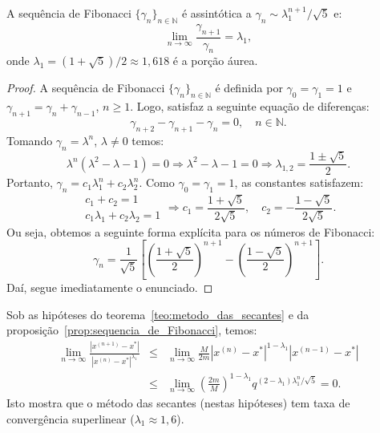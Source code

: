 \begin{prop}\label{prop:sequencia_de_Fibonacci}
  A sequência de Fibonacci $\{\gamma_n\}_{n\in\mathbb{N}}$ é assintótica a $\gamma_n \sim \lambda_1^{n+1}/\sqrt{5}$ e:
\begin{equation*}
  \lim_{n\to\infty} \frac{\gamma_{n+1}}{\gamma_{n}} = \lambda_1,
\end{equation*}
onde $\lambda_1 = (1+\sqrt{5})/2\approx 1,618$ é a porção áurea.
\end{prop}
\begin{proof}
  A sequência de Fibonacci $\{\gamma_n\}_{n\in\mathbb{N}}$ é definida por $\gamma_0 = \gamma_1 = 1$ e $\gamma_{n+1} = \gamma_n + \gamma_{n-1}$, $n\geq 1$. Logo, satisfaz a seguinte equação de diferenças:
  \begin{equation*}
    \gamma_{n+2} - \gamma_{n+1} - \gamma_{n} = 0,\quad n\in\mathbb{N}.
  \end{equation*}
Tomando $\gamma_n = \lambda^n$, $\lambda\neq 0$ temos:
\begin{equation*}
  \lambda^n\left(\lambda^2 - \lambda - 1\right) = 0 \Rightarrow   \lambda^2 - \lambda - 1 = 0 \Rightarrow \lambda_{1,2} = \frac{1 \pm \sqrt{5}}{2}.
\end{equation*}
Portanto, $\gamma_n = c_1\lambda_1^n + c_2\lambda_2^n$. Como $\gamma_0 = \gamma_1 = 1$, as constantes satisfazem:
\begin{equation*}
  \begin{array}{l}
    c_1 + c_2 = 1\\
    c_1\lambda_1 + c_2\lambda_2 = 1
  \end{array}
    \Rightarrow
    c_1 = \frac{1+\sqrt{5}}{2\sqrt{5}},\quad c_2 = -\frac{1-\sqrt{5}}{2\sqrt{5}}.
\end{equation*}
Ou seja, obtemos a seguinte forma explícita para os números de Fibonacci:
\begin{equation*}
  \gamma_n = \frac{1}{\sqrt{5}}\left[\left(\frac{1+\sqrt{5}}{2}\right)^{n+1} - \left(\frac{1-\sqrt{5}}{2}\right)^{n+1}\right].
\end{equation*}
Daí, segue imediatamente o enunciado.
\end{proof}

\begin{obs}
  Sob as hipóteses do teorema~\ref{teo:metodo_das_secantes} e da proposição~\ref{prop:sequencia_de_Fibonacci}, temos:
  \begin{eqnarray*}
    \lim_{n\to\infty} \frac{|x^{(n+1)}-x^*|}{|x^{(n)} - x^*|^{\lambda_1}} &\leq& \lim_{n\to\infty} \frac{M}{2m}|x^{(n)}-x^*|^{1-\lambda_1}|x^{(n-1)}-x^*| \\
    &\leq& \lim_{n\to\infty} \left(\frac{2m}{M}\right)^{1-\lambda_1}q^{(2-\lambda_1)\lambda_1^{n}/\sqrt{5}} = 0.
  \end{eqnarray*}
Isto mostra que o método das secantes (nestas hipóteses) tem taxa de convergência superlinear ($\lambda_1 \approx 1,6$).
\end{obs}


